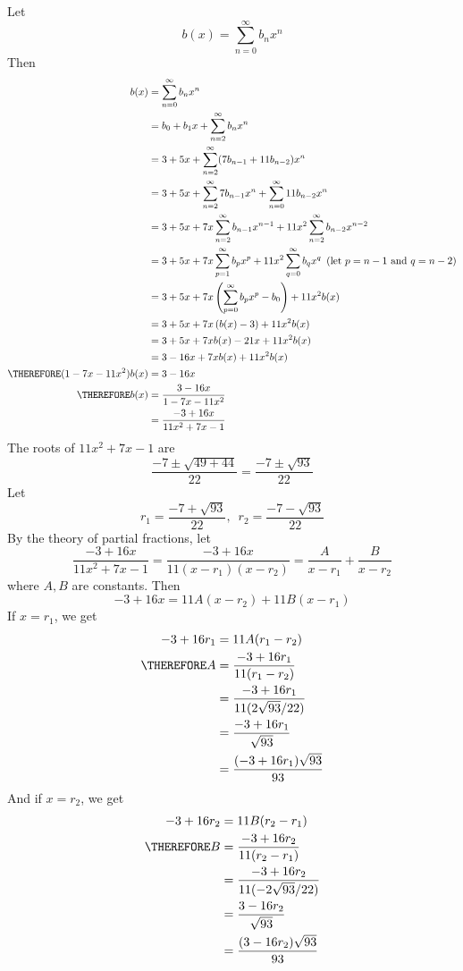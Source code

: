 Let
\[
b(x) = \sum_{n=0}^\infty b_n x^n
\]
Then
\begin{align*}
b(x)
&= \sum_{n=0}^\infty b_n x^n \\
&= b_0 + b_1x + \sum_{n=2}^\infty b_n x^n \\
&= 3 + 5x + \sum_{n=2}^\infty (7b_{n-1} + 11b_{n-2}) x^n \\
&= 3 + 5x + \sum_{n=2}^\infty 7b_{n-1}x^n + \sum_{n=0}^\infty 11b_{n-2} x^n \\
&= 3 + 5x + 7x\sum_{n=2}^\infty b_{n-1}x^{n-1}
+ 11x^2\sum_{n=2}^\infty b_{n-2} x^{n-2} \\
&= 3 + 5x + 7x\sum_{p=1}^\infty b_{p}x^{p}
+ 11x^2\sum_{q=0}^\infty b_{q} x^{q}
\,\,\,\text{(let $p = n-1$ and $q=n-2$)}
\\
&= 3 + 5x + 7x\left( \sum_{p=0}^\infty b_{p}x^{p} - b_0 \right)
+ 11x^2b(x)
\\
&= 3 + 5x + 7x\left( b(x) - 3 \right)
+ 11x^2b(x)
\\
&= 3 + 5x + 7x b(x) - 21x + 11x^2b(x)
\\
&= 3 -16x + 7x b(x) + 11x^2b(x)
\\
\THEREFORE (1 - 7x - 11x^2) b(x)
&= 3 -16x
\\
\THEREFORE  b(x)
&= \frac{3 - 16x}{1 - 7x - 11x^2}
\\
&= \frac{-3 + 16x}{11x^2 + 7x -1}
\end{align*}
The roots of $11x^2 + 7x -1$ are
\[
\frac{-7 \pm \sqrt{49 + 44}}{22}
=
\frac{-7 \pm \sqrt{93}}{22}
\]
Let
\[
r_1 = \frac{-7 + \sqrt{93}}{22}, \,\,\,
r_2 = \frac{-7 - \sqrt{93}}{22}
\]
By the theory of partial fractions, let
\[
\frac{-3 + 16x}{11x^2 + 7x -1}
=
\frac{-3 + 16x}{11(x - r_1)(x - r_2)}
=
\frac{A}{x - r_1} + \frac{B}{x - r_2}
\]
where $A,B$ are constants.
Then
\[
-3 + 16x
=
11A(x - r_2) + 11B(x - r_1)
\]
If $x = r_1$, we get
\begin{align*}
-3 + 16r_1
&= 11A(r_1 - r_2)
\\
\THEREFORE
A
&= \frac{-3 + 16r_1}{11(r_1 - r_2)} \\
&= \frac{-3 + 16r_1}{11(2\sqrt{93}/22)} \\
&= \frac{-3 + 16r_1}{\sqrt{93}} \\
&= \frac{(-3 + 16r_1)\sqrt{93}}{93} 
\end{align*}
And if $x = r_2$, we get
\begin{align*}
-3 + 16r_2
&= 11B(r_2 - r_1)
\\
\THEREFORE
B
&= \frac{-3 + 16r_2}{11(r_2 - r_1)} \\
&= \frac{-3 + 16r_2}{11(-2\sqrt{93}/22)} \\
&= \frac{3 - 16r_2}{\sqrt{93}} \\
&= \frac{(3 - 16r_2)\sqrt{93}}{93} 
\end{align*}
